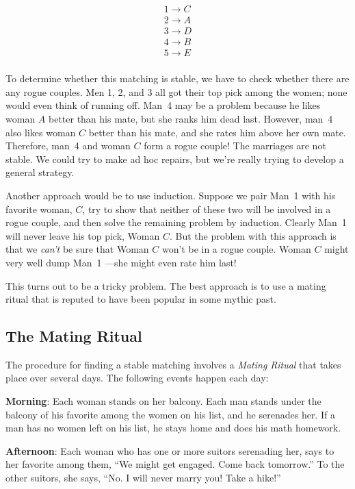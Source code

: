 \begin{eqnarray*}
1 \rightarrow C \\
2 \rightarrow A \\
3 \rightarrow D \\
4 \rightarrow B \\
5 \rightarrow E \\
\end{eqnarray*}

To determine whether this matching is stable, we have to check whether
there are any rogue couples.  Men 1, 2, and 3 all got their top pick
among the women; none would even think of running off.  Man~4 may be a
problem because he likes woman $A$ better than his mate, but she ranks him
dead last.  However, man~4 also likes woman $C$ better than his mate, and
she rates him above her own mate.  Therefore, man~4 and woman $C$ form a
rogue couple!  The marriages are not stable.  We could try to make ad hoc
repairs, but we're really trying to develop a general strategy.

Another approach would be to use induction.  Suppose we pair Man~1
with his favorite woman, $C$, try to show that neither of these two
will be involved in a rogue couple, and then solve the remaining
problem by induction.  Clearly Man~1 will never leave his top pick,
Woman $C$.  But the problem with this approach is that we \emph{can't}
be sure that Woman $C$ won't be in a rogue couple.  Woman $C$ might very
well dump Man~1 ---she might even rate him last!

This turns out to be a tricky problem.  The best approach is to use a
mating ritual that is reputed to have been popular in some mythic past.
\fi

\subsection{The Mating Ritual}

The procedure for finding a stable matching involves a \emph{Mating
Ritual} that takes place over several days.  The following events happen
each day:

\textbf{Morning}: Each woman stands on her balcony.  Each man stands
under the balcony of his favorite among the women on his list, and he
serenades her.  If a man has no women left on his list, he stays home
and does his math homework.

\textbf{Afternoon}: Each woman who has one or more suitors serenading
her, says to her favorite among them, ``We might get engaged.  Come
back tomorrow.''  To the other suitors, she says, ``No.  I will never
marry you!  Take a hike!''

